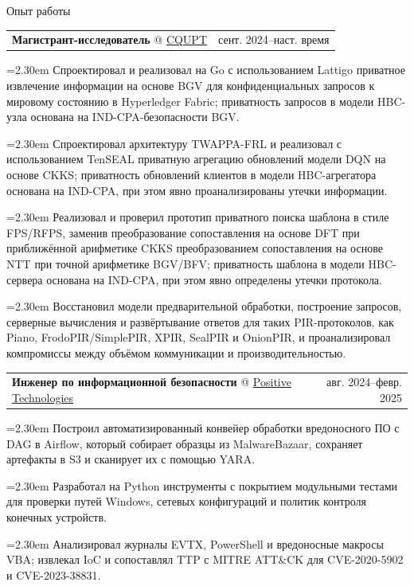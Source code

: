 \documentclass[11pt,a4paper]{article}
\makeatletter
\newcommand{\cvrow}[2]{%
  \noindent
  \begin{minipage}[t]{0.145\textwidth}
    \vspace{0pt}%
    \raggedright
    \fontsize{10.5}{12.5}\selectfont
    #1
  \end{minipage}%
  \hfill
  \begin{minipage}[t]{0.835\textwidth}
    \vspace{0pt}%
    #2
  \end{minipage}\par
}
\newcommand{\workentry}[2]{%
  \noindent
  \begin{tabularx}{\linewidth}
    {@{}X@{\hspace{0.8em}}r@{}}
    #1 & \small #2
  \end{tabularx}\par
  \vspace{0.15em}
}
\newcommand{\workproject}[1]{%
  \noindent
  \hangindent=2.30em
  \hangafter=1
  \hspace*{1.15em}\makebox[1.15em][l]{$\diamond$}#1\par
  \vspace{0.12em}
}
\makeatother
\begin{document}
\cvrow{Опыт работы}{%
  \workentry
    {\textbf{Магистрант-исследователь} @
    \href{https://www.cqupt.edu.cn/}{CQUPT}}
    {сент. 2024--наст. время}

  \workproject{Спроектировал и реализовал на Go с использованием Lattigo
  приватное извлечение информации на основе BGV для конфиденциальных запросов
  к мировому состоянию в Hyperledger Fabric; приватность запросов в модели
  HBC-узла основана на IND-CPA-безопасности BGV.}

  \workproject{Спроектировал архитектуру TWAPPA-FRL и реализовал с использованием
  TenSEAL приватную агрегацию обновлений модели DQN на основе CKKS; приватность
  обновлений клиентов в модели HBC-агрегатора основана на IND-CPA, при этом
  явно проанализированы утечки информации.}

  \workproject{Реализовал и проверил прототип приватного поиска шаблона в стиле
  FPS/RFPS, заменив преобразование сопоставления на основе DFT при приближённой
  арифметике CKKS преобразованием сопоставления на основе NTT при точной
  арифметике BGV/BFV; приватность шаблона в модели HBC-сервера основана
  на IND-CPA, при этом явно определены утечки протокола.}


  \workproject{Восстановил модели предварительной обработки, построение запросов,
  серверные вычисления и развёртывание ответов для таких PIR-протоколов, как
  Piano, FrodoPIR/SimplePIR, XPIR, SealPIR и OnionPIR, и проанализировал
  компромиссы между объёмом коммуникации и производительностью.}
}
\vspace{0.50em}

\cvrow{}{%
  \workentry
    {\textbf{Инженер по информационной безопасности} @
    \href{https://global.ptsecurity.com/en/}{Positive Technologies}}
    {авг. 2024--февр. 2025}
  \workproject{Построил автоматизированный конвейер обработки вредоносного ПО
  с DAG в Airflow, который собирает образцы из MalwareBazaar, сохраняет
  артефакты в S3 и сканирует их с помощью YARA.}
  \workproject{Разработал на Python инструменты с покрытием модульными тестами
  для проверки путей Windows, сетевых конфигураций и политик контроля
  конечных устройств.}
  \workproject{Анализировал журналы EVTX, PowerShell и вредоносные макросы VBA;
  извлекал IoC и сопоставлял TTP с MITRE ATT\&CK для CVE-2020-5902
  и CVE-2023-38831.}
}

\vspace{0.50em}
\end{document}
